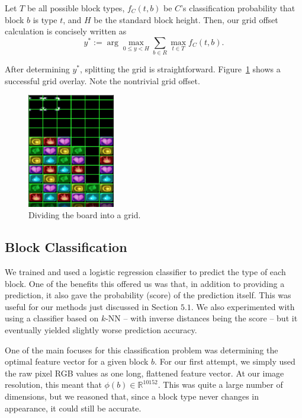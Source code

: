 \documentclass[12pt]{IEEEtran}
\begin{document}
Let $T$ be all possible block types, $f_C(t, b)$ be $C$'s classification probability that block $b$ is type $t$, and $H$ be the standard block height. Then, our grid offset calculation is concisely written as
\[ y^* := \arg\max_{0 \leq y < H} \sum_{b \in R} \max_{t \in T} f_C(t, b). \]

After determining $y^*$, splitting the grid is straightforward. Figure~\ref{fig:grid} shows a successful grid overlay. Note the nontrivial grid offset.

\begin{figure}[h!]
\centerline{\includegraphics[width=1.5in]{grid.png}}
\caption{Dividing the board into a grid.}
\label{fig:grid}
\end{figure}

\subsection{Block Classification}

We trained and used a logistic regression classifier to predict the type of each block. One of the benefits this offered us was that, in addition to providing a prediction, it also gave the probability (score) of the prediction itself. This was useful for our methods just discussed in Section $5.1$. We also experimented with using a classifier based on $k$-NN -- with inverse distances being the score -- but it eventually yielded slightly worse prediction accuracy.

One of the main focuses for this classification problem was determining the optimal feature vector for a given block $b$. For our first attempt, we simply used the raw pixel RGB values as one long, flattened feature vector. At our image resolution, this meant that $\phi(b) \in \mathbb{R}^{10152}$. This was quite a large number of dimensions, but we reasoned that, since a block type never changes in appearance, it could still be accurate.
\end{document}
